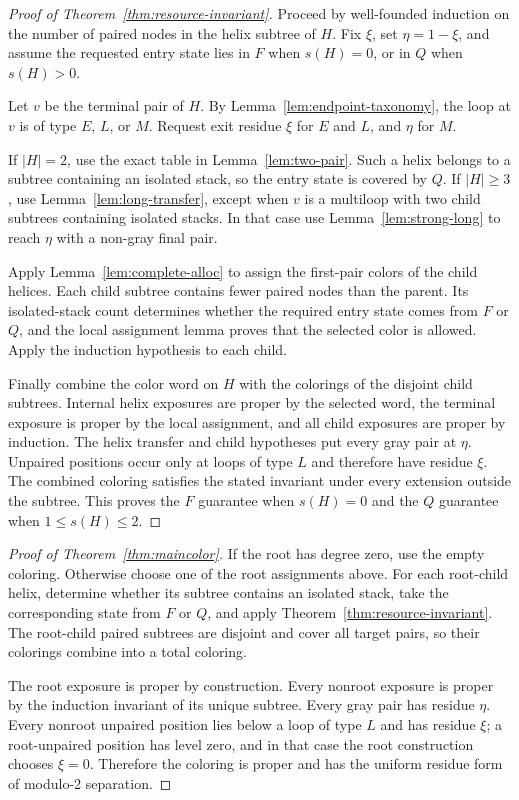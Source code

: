 \documentclass[11pt]{article}
\newcommand{\shortcount}{s}
\begin{document}
\begin{proof}[Proof of Theorem~\ref{thm:resource-invariant}]
Proceed by well-founded induction on the number of paired nodes in the helix subtree of $H$.  Fix $\xi$, set $\eta=1-\xi$, and assume the requested entry state lies in $F$ when $\shortcount(H)=0$, or in $Q$ when $\shortcount(H)>0$.

Let $v$ be the terminal pair of $H$.  By Lemma~\ref{lem:endpoint-taxonomy}, the loop at $v$ is of type $E$, $L$, or $M$.  Request exit residue $\xi$ for $E$ and $L$, and $\eta$ for $M$.

If $|H|=2$, use the exact table in Lemma~\ref{lem:two-pair}.  Such a helix belongs to a subtree containing an isolated stack, so the entry state is covered by $Q$.  If $|H|\ge3$, use Lemma~\ref{lem:long-transfer}, except when $v$ is a multiloop with two child subtrees containing isolated stacks.  In that case use Lemma~\ref{lem:strong-long} to reach $\eta$ with a non-gray final pair.

Apply Lemma~\ref{lem:complete-alloc} to assign the first-pair colors of the child helices.  Each child subtree contains fewer paired nodes than the parent.  Its isolated-stack count determines whether the required entry state comes from $F$ or $Q$, and the local assignment lemma proves that the selected color is allowed.  Apply the induction hypothesis to each child.

Finally combine the color word on $H$ with the colorings of the disjoint child subtrees.  Internal helix exposures are proper by the selected word, the terminal exposure is proper by the local assignment, and all child exposures are proper by induction.  The helix transfer and child hypotheses put every gray pair at $\eta$.  Unpaired positions occur only at loops of type $L$ and therefore have residue $\xi$.  The combined coloring satisfies the stated invariant under every extension outside the subtree.  This proves the $F$ guarantee when $\shortcount(H)=0$ and the $Q$ guarantee when $1\le\shortcount(H)\le2$.
\end{proof}

\begin{proof}[Proof of Theorem~\ref{thm:maincolor}]
If the root has degree zero, use the empty coloring.  Otherwise choose one of the root assignments above.  For each root-child helix, determine whether its subtree contains an isolated stack, take the corresponding state from $F$ or $Q$, and apply Theorem~\ref{thm:resource-invariant}.  The root-child paired subtrees are disjoint and cover all target pairs, so their colorings combine into a total coloring.

The root exposure is proper by construction.  Every nonroot exposure is proper by the induction invariant of its unique subtree.  Every gray pair has residue $\eta$.  Every nonroot unpaired position lies below a loop of type $L$ and has residue $\xi$; a root-unpaired position has level zero, and in that case the root construction chooses $\xi=0$.  Therefore the coloring is proper and has the uniform residue form of modulo-2 separation.
\end{proof}
\end{document}
